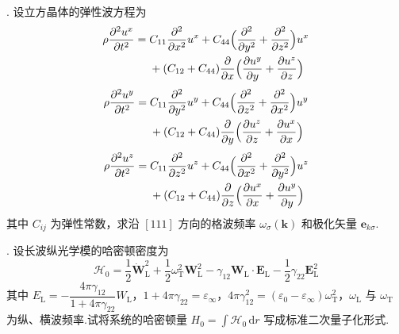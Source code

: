 {.} 设立方晶体的弹性波方程为
\begin{equation*}
\begin{aligned}
  \rho\frac{\partial^{2}u^{x}}{\partial t^{2}}
  ={}&C_{11}\frac{\partial^{2}}{\partial x^{2}}u^{x}
  +C_{44}\Bigl(\frac{\partial^{2}}{\partial y^{2}}+\frac{\partial^{2}}{\partial z^{2}}\Bigr)u^{x}\\
  &+(C_{12}+C_{44})\frac{\partial}{\partial x}\Bigl(\frac{\partial u^{y}}{\partial y}+\frac{\partial u^{z}}{\partial z}\Bigr)
\end{aligned}
\end{equation*}
\begin{equation*}
\begin{aligned}
  \rho\frac{\partial^{2}u^{y}}{\partial t^{2}}
  ={}&C_{11}\frac{\partial^{2}}{\partial y^{2}}u^{y}
  +C_{44}\Bigl(\frac{\partial^{2}}{\partial z^{2}}+\frac{\partial^{2}}{\partial x^{2}}\Bigr)u^{y}\\
  &+(C_{12}+C_{44})\frac{\partial}{\partial y}\Bigl(\frac{\partial u^{z}}{\partial z}+\frac{\partial u^{x}}{\partial x}\Bigr)
\end{aligned}
\end{equation*}
\begin{equation*}
\begin{aligned}
  \rho\frac{\partial^{2}u^{z}}{\partial t^{2}}
  ={}&C_{11}\frac{\partial^{2}}{\partial z^{2}}u^{z}
  +C_{44}\Bigl(\frac{\partial^{2}}{\partial x^{2}}+\frac{\partial^{2}}{\partial y^{2}}\Bigr)u^{z}\\
  &+(C_{12}+C_{44})\frac{\partial}{\partial z}\Bigl(\frac{\partial u^{x}}{\partial x}+\frac{\partial u^{y}}{\partial y}\Bigr)
\end{aligned}
\end{equation*}
其中 $C_{ij}$ 为弹性常数，求沿 $[111]$ 方向的格波频率 $\omega_{\sigma}(\boldsymbol{k})$ 和极化矢量 $\boldsymbol{e}_{k\sigma}$.

{.} 设长波纵光学模的哈密顿密度为
\begin{equation*}
  \mathscr{H}_{0}=\frac{1}{2}\dot{\boldsymbol{W}}_{\mathrm{L}}^{2}
  +\frac{1}{2}\omega_{\mathrm{T}}^{2}\boldsymbol{W}_{\mathrm{L}}^{2}
  -\gamma_{12}\boldsymbol{W}_{\mathrm{L}}\cdot\boldsymbol{E}_{\mathrm{L}}
  -\frac{1}{2}\gamma_{22}\boldsymbol{E}_{\mathrm{L}}^{2}
\end{equation*}
其中 $E_{\mathrm{L}}=-\dfrac{4\pi\gamma_{12}}{1+4\pi\gamma_{22}}W_{\mathrm{L}}$，$1+4\pi\gamma_{22}=\varepsilon_{\infty}$，$4\pi\gamma_{12}^{2}=(\varepsilon_{0}-\varepsilon_{\infty})\omega_{\mathrm{T}}^{2}$，$\omega_{\mathrm{L}}$ 与 $\omega_{\mathrm{T}}$ 为纵、横波频率.试将系统的哈密顿量 $H_{0}=\int\mathscr{H}_{0}\,\mathrm{d}r$ 写成标准二次量子化形式.

